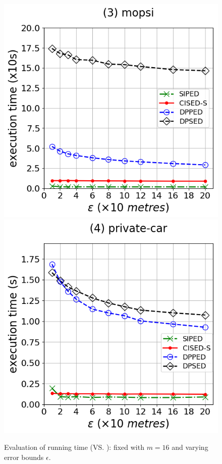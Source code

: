 {\begin{figure}[tb!]
\includegraphics[scale = 0.290]{Figures/Exp-time-epsilon-ped-mopsi.png}\hspace{1ex}
\includegraphics[scale = 0.290]{Figures/Exp-time-epsilon-ped-private.png}
\caption{\small Evaluation of running time (\ped VS. \sed): fixed with $m=16$ and varying error
  bounds $\epsilon$.}
\label{fig:time-ped}
\end{figure}


}
